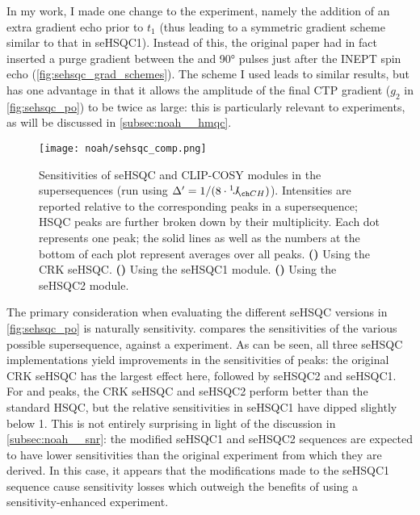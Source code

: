 In my work, I made one change to the experiment, namely the addition of an extra gradient echo prior to $t_1$ (thus leading to a symmetric gradient scheme similar to that in seHSQC1).
Instead of this, the original paper had in fact inserted a purge gradient between the \proton{} and \carbon{} \ang{90} pulses just after the INEPT spin echo (\cref{fig:sehsqc_grad_schemes}).
The scheme I used leads to similar results, but has one advantage in that it allows the amplitude of the final CTP gradient ($g_2$ in \cref{fig:sehsqc_po}) to be twice as large: this is particularly relevant to \nitrogen{} experiments, as will be discussed in \cref{subsec:noah__hmqc}.

\begin{figure}[!ht]
    \centering
    \texttt{[image: noah/sehsqc\_comp.png]}%
    {\label{fig:noah_sehsqc_comp_crk}}%
    {\label{fig:noah_sehsqc_comp_v1}}%
    {\label{fig:noah_sehsqc_comp_v2}}%
    \caption[Comparison of  sensitivities]{
        Sensitivities of seHSQC and CLIP-COSY modules in the  supersequences (run using $\Delta' = 1 / (8 \cdot \oneJ{CH})$).
        Intensities are reported relative to the corresponding peaks in a  supersequence; HSQC peaks are further broken down by their multiplicity.
        Each dot represents one peak; the solid lines as well as the numbers at the bottom of each plot represent averages over all peaks.
        \textbf{()} Using the CRK seHSQC.
        \textbf{()} Using the seHSQC1 module.
        \textbf{()} Using the seHSQC2 module.
    }
    \label{fig:noah_sehsqc_comp}
\end{figure}

The primary consideration when evaluating the different seHSQC versions in \cref{fig:sehsqc_po} is naturally sensitivity.
 compares the sensitivities of the various possible  supersequence, against a  experiment.
As can be seen, all three seHSQC implementations yield improvements in the sensitivities of  peaks: the original CRK seHSQC has the largest effect here, followed by seHSQC2 and seHSQC1.
For  and  peaks, the CRK seHSQC and seHSQC2 perform better than the standard HSQC, but the relative sensitivities in seHSQC1 have dipped slightly below 1.
This is not entirely surprising in light of the discussion in \cref{subsec:noah__snr}: the modified seHSQC1 and seHSQC2 sequences are expected to have lower sensitivities than the original experiment from which they are derived.
In this case, it appears that the modifications made to the seHSQC1 sequence cause sensitivity losses which outweigh the benefits of using a sensitivity-enhanced experiment.

